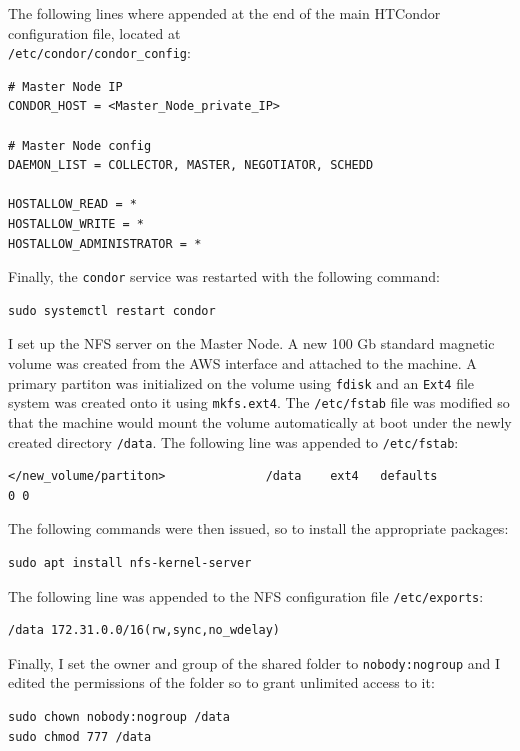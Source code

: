 \documentclass{article}
\begin{document}
The following lines where appended at the end of the main HTCondor configuration file, located at\\
\texttt{/etc/condor/condor\_config}:

\begin{lstlisting}
# Master Node IP
CONDOR_HOST = <Master_Node_private_IP>

# Master Node config 
DAEMON_LIST = COLLECTOR, MASTER, NEGOTIATOR, SCHEDD

HOSTALLOW_READ = *
HOSTALLOW_WRITE = *
HOSTALLOW_ADMINISTRATOR = *
\end{lstlisting}

Finally, the \texttt{condor} service was restarted with the following command:

\begin{lstlisting}
sudo systemctl restart condor
\end{lstlisting}

I set up the NFS server on the Master Node.
A new 100 Gb standard magnetic volume was created from the AWS interface and attached to the machine.
A primary partiton was initialized on the volume using \texttt{fdisk} and an \texttt{Ext4} file system was created onto it using \texttt{mkfs.ext4}.
The \texttt{/etc/fstab} file was modified so that the machine would mount the volume automatically at boot under the newly created directory \texttt{/data}.
The following line was appended to \texttt{/etc/fstab}:

\begin{lstlisting}
</new_volume/partiton>              /data    ext4   defaults                0 0
\end{lstlisting}

The following commands were then issued, so to install the appropriate packages:

\begin{lstlisting}
sudo apt install nfs-kernel-server
\end{lstlisting}

The following line was appended to the NFS configuration file \texttt{/etc/exports}:

\begin{lstlisting}
/data 172.31.0.0/16(rw,sync,no_wdelay)
\end{lstlisting}

Finally, I set the owner and group of the shared folder to \texttt{nobody:nogroup} and I edited the permissions of the folder so to grant unlimited access to it:

\begin{lstlisting}
sudo chown nobody:nogroup /data
sudo chmod 777 /data
\end{lstlisting}
\end{document}
